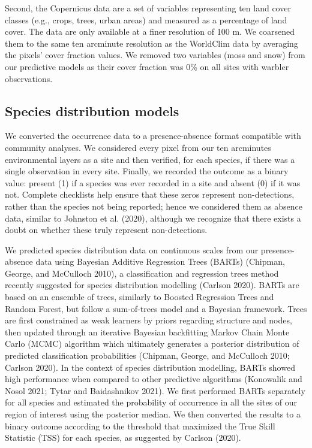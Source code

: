 \documentclass[10pt,oneside]{article}
\begin{document}
Second, the Copernicus data are a set of variables representing ten land
cover classes (e.g., crops, trees, urban areas) and measured as a
percentage of land cover. The data are only available at a finer
resolution of 100 m. We coarsened them to the same ten arcminute
resolution as the WorldClim data by averaging the pixels' cover fraction
values. We removed two variables (moss and snow) from our predictive
models as their cover fraction was 0\% on all sites with warbler
observations.

\hypertarget{species-distribution-models}{%
\subsection{Species distribution
models}\label{species-distribution-models}}

We converted the occurrence data to a presence-absence format compatible
with community analyses. We considered every pixel from our ten
arcminutes environmental layers as a site and then verified, for each
species, if there was a single observation in every site. Finally, we
recorded the outcome as a binary value: present (1) if a species was
ever recorded in a site and absent (0) if it was not. Complete
checklists help ensure that these zeros represent non-detections, rather
than the species not being reported; hence we considered them as absence
data, similar to Johnston et al. (2020), although we recognize that
there exists a doubt on whether these truly represent non-detections.

We predicted species distribution data on continuous scales from our
presence-absence data using Bayesian Additive Regression Trees (BARTs)
(Chipman, George, and McCulloch 2010), a classification and regression
trees method recently suggested for species distribution modelling
(Carlson 2020). BARTs are based on an ensemble of trees, similarly to
Boosted Regression Trees and Random Forest, but follow a sum-of-trees
model and a Bayesian framework. Trees are first constrained as weak
learners by priors regarding structure and nodes, then updated through
an iterative Bayesian backfitting Markov Chain Monte Carlo (MCMC)
algorithm which ultimately generates a posterior distribution of
predicted classification probabilities (Chipman, George, and McCulloch
2010; Carlson 2020). In the context of species distribution modelling,
BARTs showed high performance when compared to other predictive
algorithms (Konowalik and Nosol 2021; Tytar and Baidashnikov 2021). We
first performed BARTs separately for all species and estimated the
probability of occurrence in all the sites of our region of interest
using the posterior median. We then converted the results to a binary
outcome according to the threshold that maximized the True Skill
Statistic (TSS) for each species, as suggested by Carlson (2020).
\end{document}
